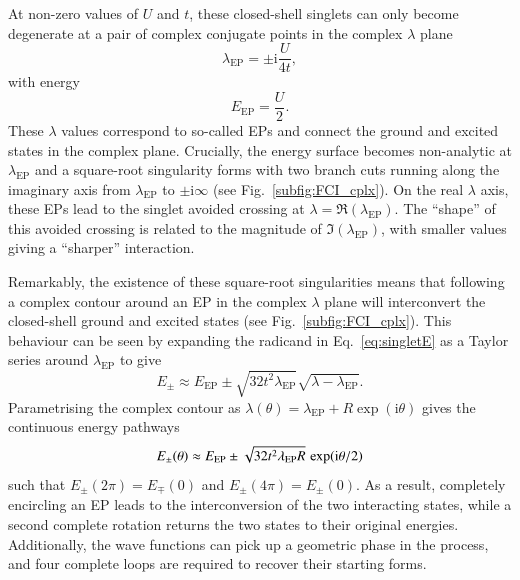 \documentclass[aps,prb,reprint,noshowkeys,superscriptaddress]{revtex4-1}
\renewcommand{\i}{\mathrm{i}} %
\begin{document}
At non-zero values of $U$ and $t$, these closed-shell singlets can only become degenerate at a pair of complex conjugate points in the complex $\lambda$ plane 
\begin{equation}
\lambda_{\text{EP}} = \pm  \i \frac{U}{4t},
\end{equation}
with energy
\begin{equation}
\label{eq:E_EP}
	E_\text{EP} = \frac{U}{2}.
\end{equation}
These $\lambda$ values correspond to so-called EPs and connect the ground and excited states in the complex plane.
Crucially, the energy surface becomes non-analytic at $\lambda_{\text{EP}}$ and a square-root singularity forms with two branch cuts running along the imaginary axis from $\lambda_{\text{EP}}$  to $\pm \i \infty$ (see Fig.~\ref{subfig:FCI_cplx}).
On the real $\lambda$ axis, these EPs lead to the singlet avoided crossing at $\lambda = \Re(\lambda_{\text{EP}})$.
The ``shape'' of this avoided crossing is related to the magnitude of $\Im(\lambda_{\text{EP}})$, with smaller values giving a ``sharper'' interaction.

Remarkably, the existence of these square-root singularities means that following a complex contour around an EP in the complex $\lambda$ plane will interconvert the closed-shell ground and excited states (see Fig.~\ref{subfig:FCI_cplx}).
This behaviour can be seen by expanding the radicand in Eq.~\eqref{eq:singletE} as a Taylor series around $\lambda_{\text{EP}}$ to give
\begin{equation}
E_{\pm} \approx E_{\text{EP}} \pm \sqrt{32t^2 \lambda_{\text{EP}}} \sqrt{\lambda - \lambda_{\text{EP}}}.
\end{equation}
Parametrising the complex contour as $\lambda(\theta) = \lambda_{\text{EP}} + R \exp(\i \theta)$ gives the continuous energy pathways 
\begin{equation}
E_{\pm} \qty(\theta) \approx E_{\text{EP}} \pm \sqrt{32t^2 \lambda_{\text{EP}} R}\, \exp(\i \theta/2)
\end{equation}
such that $E_{\pm}(2\pi)  = E_{\mp}(0)$ and $E_{\pm}(4\pi)  = E_{\pm}(0)$.
As a result, completely encircling an EP leads to the interconversion of the two interacting states, while a second complete rotation returns the two states to their original energies.
Additionally, the wave functions  can pick up a geometric phase in the process, and four complete loops are required to recover their starting forms.\cite{MoiseyevBook}
\end{document}
